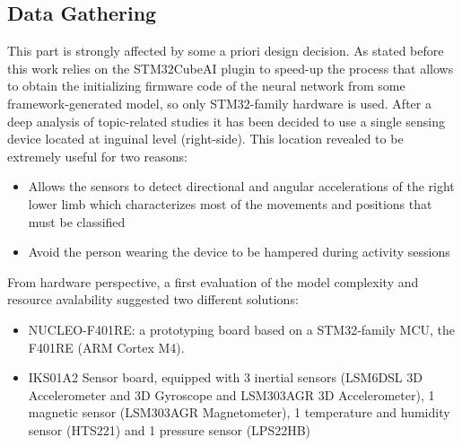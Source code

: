\subsection{Data Gathering}
This part is strongly affected by some a priori design decision. As stated before this work relies on the STM32CubeAI plugin to speed-up the process that allows to obtain the initializing firmware code of the neural network from some framework-generated model, so only STM32-family hardware is used. After a deep analysis of topic-related studies it has been decided to use a single sensing device located at inguinal level (right-side). This location revealed to be extremely useful for two reasons:
\begin{itemize}
	\item Allows the sensors to detect directional and angular accelerations of the right lower limb which characterizes most of the movements and positions that must be classified 
	\item Avoid the person wearing the device to be hampered during activity sessions
\end{itemize}
From hardware perspective, a first evaluation of the model complexity and resource avalability suggested two different solutions:
\begin{itemize}
	\item NUCLEO-F401RE: a prototyping board based on a STM32-family MCU, the F401RE (ARM Cortex M4).
	\item IKS01A2 Sensor board, equipped with 3 inertial sensors (LSM6DSL 3D Accelerometer and 3D Gyroscope and LSM303AGR 3D Accelerometer), 1 magnetic sensor (LSM303AGR Magnetometer), 1 temperature and humidity sensor (HTS221) and 1 pressure sensor (LPS22HB)
\end{itemize} 

